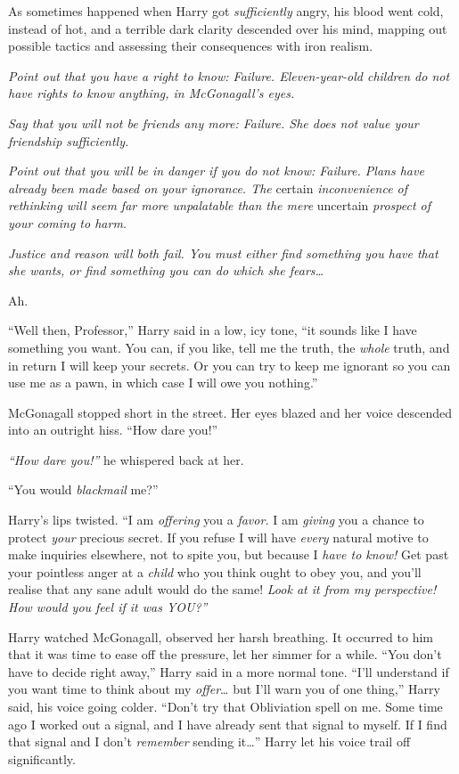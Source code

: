 As sometimes happened when Harry got \emph{sufficiently} angry, his
blood went cold, instead of hot, and a terrible dark clarity descended
over his mind, mapping out possible tactics and assessing their
consequences with iron realism.

\emph{Point out that you have a right to know: Failure. Eleven-year-old
children do not have rights to know anything, in McGonagall's eyes.}

\emph{Say that you will not be friends any more: Failure. She does not
value your friendship sufficiently.}

\emph{Point out that you will be in danger if you do not know: Failure.
Plans have already been made based on your ignorance. The} certain
\emph{inconvenience of rethinking will seem far more unpalatable than
the mere} uncertain \emph{prospect of your coming to harm.}

\emph{Justice and reason will both fail. You must either find something
you have that she wants, or find something you can do which she
fears\ldots{}}

Ah.

``Well then, Professor,'' Harry said in a low, icy tone, ``it sounds
like I have something you want. You can, if you like, tell me the truth,
the \emph{whole} truth, and in return I will keep your secrets. Or you
can try to keep me ignorant so you can use me as a pawn, in which case I
will owe you nothing.''

McGonagall stopped short in the street. Her eyes blazed and her voice
descended into an outright hiss. ``How dare you!''

\emph{``How dare you!''} he whispered back at her.

``You would \emph{blackmail} me?''

Harry's lips twisted. ``I am \emph{offering} you a \emph{favor.} I am
\emph{giving} you a chance to protect \emph{your} precious secret. If
you refuse I will have \emph{every} natural motive to make inquiries
elsewhere, not to spite you, but because I \emph{have to know!} Get past
your pointless anger at a \emph{child} who you think ought to obey you,
and you'll realise that any sane adult would do the same! \emph{Look at
it from my perspective! How would you feel if it was YOU?''}

Harry watched McGonagall, observed her harsh breathing. It occurred to
him that it was time to ease off the pressure, let her simmer for a
while. ``You don't have to decide right away,'' Harry said in a more
normal tone. ``I'll understand if you want time to think about my
\emph{offer}\ldots{} but I'll warn you of one thing,'' Harry said, his
voice going colder. ``Don't try that Obliviation spell on me. Some time
ago I worked out a signal, and I have already sent that signal to
myself. If I find that signal and I don't \emph{remember} sending
it\ldots{}'' Harry let his voice trail off significantly.

